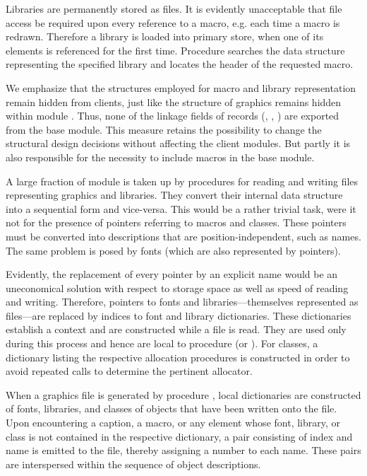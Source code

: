
Libraries are permanently stored as files. It is evidently unacceptable that file access be required upon every reference to a macro, e.g. each time a macro is redrawn. Therefore a library is loaded into primary store, when one of its elements is referenced for the first time. Procedure  searches the data structure representing the specified library and locates the header of the requested macro.

We emphasize that the structures employed for macro and library representation remain hidden from clients, just like the structure of graphics remains hidden within module . Thus, none of the linkage fields of records (, , ) are exported from the base module. This measure retains the possibility to change the structural design decisions without affecting the client modules. But partly it is also responsible for the necessity to include macros in the base module.

A large fraction of module  is taken up by procedures for reading and writing files representing graphics and libraries. They convert their internal data structure into a sequential form and vice-versa. This would be a rather trivial task, were it not for the presence of pointers referring to macros and classes. These pointers must be converted into descriptions that are position-independent, such as names. The same problem is posed by fonts (which are also represented by pointers).

Evidently, the replacement of every pointer by an explicit name would be an uneconomical solution with respect to storage space as well as speed of reading and writing. Therefore, pointers to fonts and libraries---themselves represented as files---are replaced by indices to font and library dictionaries. These dictionaries establish a context and are constructed while a file is read. They are used only during this process and hence are local to procedure  (or ). For classes, a dictionary listing the respective allocation procedures is constructed in order to avoid repeated calls to determine the pertinent allocator.

When a graphics file is generated by procedure , local dictionaries are constructed of fonts, libraries, and classes of objects that have been written onto the file. Upon encountering a caption, a macro, or any element whose font, library, or class is not contained in the respective dictionary, a pair consisting of index and name is emitted to the file, thereby assigning a number to each name. These pairs are interspersed within the sequence of object descriptions.

